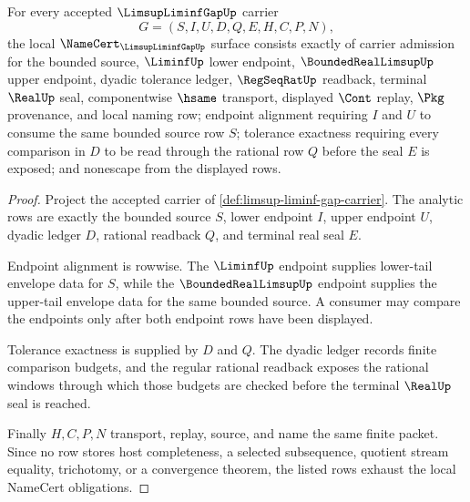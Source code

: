 \begin{theorem}
\label{thm:limsup-liminf-gap-namecert-obligations}
For every accepted $\LimsupLiminfGapUp$ carrier
$$
G=(S,I,U,D,Q,E,H,C,P,N),
$$
the local $\NameCert_{\LimsupLiminfGapUp}$ surface consists exactly of carrier admission for the bounded source, $\LiminfUp$ lower endpoint, $\BoundedRealLimsupUp$ upper endpoint, dyadic tolerance ledger, $\RegSeqRatUp$ readback, terminal $\RealUp$ seal, componentwise $\hsame$ transport, displayed $\Cont$ replay, $\Pkg$ provenance, and local naming row; endpoint alignment requiring $I$ and $U$ to consume the same bounded source row $S$; tolerance exactness requiring every comparison in $D$ to be read through the rational row $Q$ before the seal $E$ is exposed; and nonescape from the displayed rows.
\end{theorem}
\begin{proof}
Project the accepted carrier of \autoref{def:limsup-liminf-gap-carrier}. The analytic rows are exactly the bounded source $S$, lower endpoint $I$, upper endpoint $U$, dyadic ledger $D$, rational readback $Q$, and terminal real seal $E$.

Endpoint alignment is rowwise. The $\LiminfUp$ endpoint supplies lower-tail envelope data for $S$, while the $\BoundedRealLimsupUp$ endpoint supplies the upper-tail envelope data for the same bounded source. A consumer may compare the endpoints only after both endpoint rows have been displayed.

Tolerance exactness is supplied by $D$ and $Q$. The dyadic ledger records finite comparison budgets, and the regular rational readback exposes the rational windows through which those budgets are checked before the terminal $\RealUp$ seal is reached.

Finally $H,C,P,N$ transport, replay, source, and name the same finite packet. Since no row stores host completeness, a selected subsequence, quotient stream equality, trichotomy, or a convergence theorem, the listed rows exhaust the local NameCert obligations.
\end{proof}

